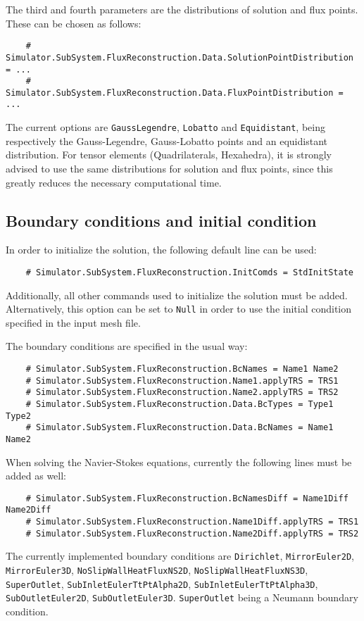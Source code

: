 \documentclass[11pt]{article}
\begin{document}
The third and fourth parameters are the distributions of solution and flux points. These can be chosen as follows:
\begin{verbatim}
    # Simulator.SubSystem.FluxReconstruction.Data.SolutionPointDistribution = ...
    # Simulator.SubSystem.FluxReconstruction.Data.FluxPointDistribution = ...
\end{verbatim}
The current options are {\tt GaussLegendre}, {\tt Lobatto} and {\tt Equidistant}, being respectively the Gauss-Legendre, Gauss-Lobatto points and an equidistant distribution. For tensor elements (Quadrilaterals, Hexahedra),  it is strongly advised to use the same distributions for solution and flux points, since this greatly reduces the necessary computational time.

\subsection{Boundary conditions and initial condition}

In order to initialize the solution, the following default line can be used:
\begin{verbatim}
    # Simulator.SubSystem.FluxReconstruction.InitComds = StdInitState
\end{verbatim}
Additionally, all other commands used to initialize the solution must be added. Alternatively, this option can be set to {\tt Null} in order to use the initial condition specified in the input mesh file. 

The boundary conditions are specified in the usual way:
\begin{verbatim}
    # Simulator.SubSystem.FluxReconstruction.BcNames = Name1 Name2
    # Simulator.SubSystem.FluxReconstruction.Name1.applyTRS = TRS1
    # Simulator.SubSystem.FluxReconstruction.Name2.applyTRS = TRS2
    # Simulator.SubSystem.FluxReconstruction.Data.BcTypes = Type1 Type2
    # Simulator.SubSystem.FluxReconstruction.Data.BcNames = Name1 Name2 
\end{verbatim}
When solving the Navier-Stokes equations, currently the following lines must be added as well:
\begin{verbatim}
    # Simulator.SubSystem.FluxReconstruction.BcNamesDiff = Name1Diff Name2Diff
    # Simulator.SubSystem.FluxReconstruction.Name1Diff.applyTRS = TRS1
    # Simulator.SubSystem.FluxReconstruction.Name2Diff.applyTRS = TRS2
\end{verbatim}
The currently implemented boundary conditions are {\tt Dirichlet}, {\tt MirrorEuler2D}, {\tt MirrorEuler3D}, {\tt NoSlipWallHeatFluxNS2D}, {\tt NoSlipWallHeatFluxNS3D}, {\tt SuperOutlet}, {\tt SubInletEulerTtPtAlpha2D}, {\tt SubInletEulerTtPtAlpha3D}, {\tt SubOutletEuler2D}, {\tt SubOutletEuler3D}. {\tt SuperOutlet} being a Neumann boundary condition.
\end{document}
